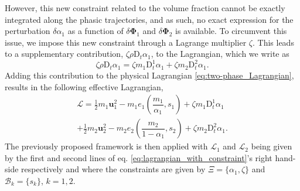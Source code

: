 \documentclass{myclass}
\newcommand{\Lag}{\mathscr{L}}
\newcommand{\Xiset}{\Xi}
\newcommand{\Bset}{\mathscr{B}}
\newcommand{\Dt}{\mathrm{D}_t}
\newcommand{\Traj}{\bm{\Phi}}
\newcommand{\half}{\tfrac{1}{2}}
\newcommand{\vel}{\bm{u}}
\newcommand{\pth}[1]  {\left( #1 \right)}
\begin{document}
However, this new constraint related to the volume fraction cannot be exactly integrated along the phasic trajectories, and as such, no exact expression for the perturbation $\delta\alpha_1$ as a function of $\delta\Traj_1$ and $\delta\Traj_2$ is available. To circumvent this issue, we impose this new constraint through a Lagrange multiplier $\zeta$. This leads to a supplementary contribution, $\zeta\rho\Dt\alpha_1$, to the Lagrangian, which we write as
\begin{equation}
\zeta\rho\Dt\alpha_1 = \zeta m_1\Dt^1\alpha_1 + \zeta m_2\Dt^2\alpha_1.
\end{equation}
Adding this contribution to the physical Lagrangian \eqref{eq:two-phase_Lagrangian}, results in the following effective Lagrangian,
\begin{multline}
\Lag = \half m_1 \vel_1^2 - m_1 e_1\pth{\dfrac{m_1}{\alpha_1},s_1} + \zeta m_1\Dt^1\alpha_1 \\ + \half m_2 \vel_2^2 - m_2 e_2\pth{\dfrac{m_2}{1-\alpha_1},s_2} + \zeta m_2\Dt^2\alpha_1.
\label{eq:lagrangian_with_constraint}
\end{multline}
The previously proposed framework is then applied with $\Lag_1$ and $\Lag_2$ being given by the first and second lines of eq. \eqref{eq:lagrangian_with_constraint}'s right hand-side respectively and where the constraints are given by $\Xiset=\{\alpha_1,\zeta\}$ and $\Bset_k=\{s_k\}$, $k=1,2$.  
\end{document}

